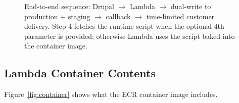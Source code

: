 \documentclass[11pt,letterpaper]{article}
\begin{document}
\begin{figure}[h!]
\caption{End-to-end sequence: Drupal $\rightarrow$ Lambda $\rightarrow$ dual-write to production + staging $\rightarrow$ callback $\rightarrow$ time-limited customer delivery. Step 4 fetches the runtime script when the optional 4th parameter is provided; otherwise Lambda uses the script baked into the container image.}
\label{fig:sequence}
\end{figure}

\subsection{Lambda Container Contents}
\label{sec:meeting-container}
Figure~\ref{fig:container} shows what the ECR container image includes.
\end{document}
